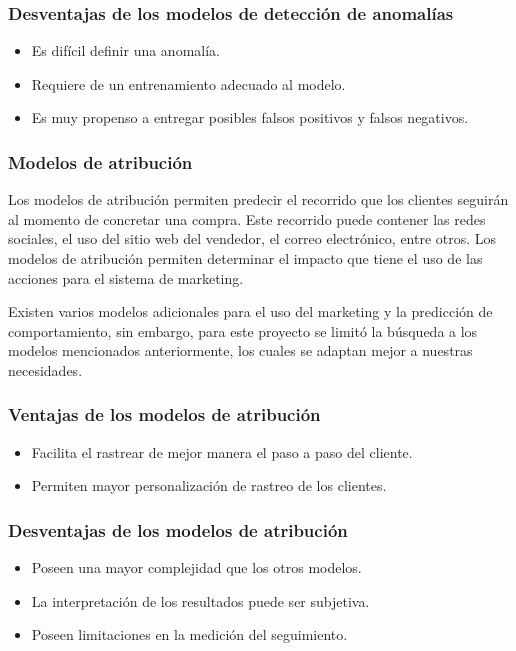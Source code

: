 \subsubsection{Desventajas de los modelos de detección de anomalías}
\begin{itemize}
    \item Es difícil definir una anomalía.
    \item Requiere de un entrenamiento adecuado al modelo.
    \item Es muy propenso a entregar posibles falsos positivos y falsos negativos.
\end{itemize}

\subsubsection{Modelos de atribución}
Los modelos de atribución permiten predecir el recorrido que los clientes seguirán al momento de concretar una compra. Este recorrido puede contener las redes sociales, el uso del sitio web del vendedor, el correo electrónico, entre otros. Los modelos de atribución permiten determinar el impacto que tiene el uso de las acciones para el sistema de marketing. 

Existen varios modelos adicionales para el uso del marketing y la predicción de comportamiento, sin embargo, para este proyecto se limitó la búsqueda a los modelos mencionados anteriormente, los cuales se adaptan mejor a nuestras necesidades.

\subsubsection{Ventajas de los modelos de atribución}
\begin{itemize}
    \item Facilita el rastrear de mejor manera el paso a paso del cliente.
    \item Permiten mayor personalización de rastreo de los clientes.
\end{itemize}

\subsubsection{Desventajas de los modelos de atribución}
\begin{itemize}
    \item Poseen una mayor complejidad que los otros modelos.
    \item La interpretación de los resultados puede ser subjetiva.
    \item Poseen limitaciones en la medición del seguimiento.
\end{itemize}
